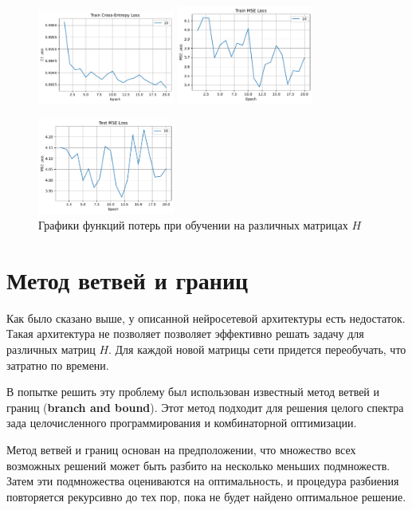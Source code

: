 \documentclass[12pt]{article}
\begin{document}
\begin{figure}
    \centering
    \includegraphics[width=0.4\textwidth]{adnn_random_epoch_train_loss.pdf}
    \quad
    \includegraphics[width=0.4\textwidth]{adnn_random_epoch_train_mse.pdf}
    
    \includegraphics[width=0.4\textwidth]{adnn_random_epoch_test_mse.pdf}
    \caption{Графики функций потерь при обучении на различных матрицах $H$}
    \label{adnn_random}
\end{figure}

\section{Метод ветвей и границ}

Как было сказано выше, у описанной нейросетевой архитектуры есть недостаток. Такая архитектура не позволяет позволяет эффективно решать задачу для различных матриц $H$. Для каждой новой матрицы сети придется переобучать, что затратно по времени.

В попытке решить эту проблему был использован известный метод ветвей и границ (\textbf{branch and bound}). Этот метод подходит для решения целого спектра зада целочисленного программирования и комбинаторной оптимизации.

Метод ветвей и границ основан на предположении, что множество всех возможных решений может быть разбито на несколько меньших подмножеств. Затем эти подмножества оцениваются на оптимальность, и процедура разбиения повторяется рекурсивно до тех пор, пока не будет найдено оптимальное решение.
\end{document}
